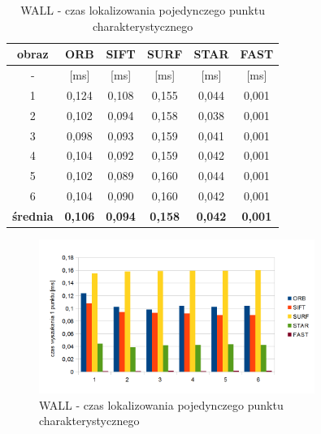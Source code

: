 \begin{table}[htbp]
  \centering
  \caption{WALL - czas lokalizowania pojedynczego punktu charakterystycznego}
    \begin{tabular}{|c|c|c|c|c|c|}
    \hline
    obraz & \textbf{ORB} & \textbf{SIFT} & \textbf{SURF} & \textbf{STAR} & \textbf{FAST} \\
    \hline
    -  & [ms] & [ms] & [ms] & [ms] & [ms] \\\hline
    1 & 0,124 & 0,108 & 0,155 & 0,044 & 0,001 \\
    2 & 0,102 & 0,094 & 0,158 & 0,038 & 0,001 \\
    3 & 0,098 & 0,093 & 0,159 & 0,041 & 0,001 \\
    4 & 0,104 & 0,092 & 0,159 & 0,042 & 0,001 \\
    5 & 0,102 & 0,089 & 0,160 & 0,044 & 0,001 \\
    6 & 0,104 & 0,090 & 0,160 & 0,042 & 0,001 \\\hline
    \textbf{średnia} & \textbf{0,106} & \textbf{0,094} & \textbf{0,158} & \textbf{0,042} & \textbf{0,001} \\
    \hline
    \end{tabular}%
  \label{tab:wall_f2}%
\end{table}%


\begin{figure}
\centering
\includegraphics[width=0.8\textwidth]{pict/mikolajczyk/wall/f2.png}
\caption{WALL - czas lokalizowania pojedynczego punktu charakterystycznego}
\label{fig:wall_f2}
\end{figure}

